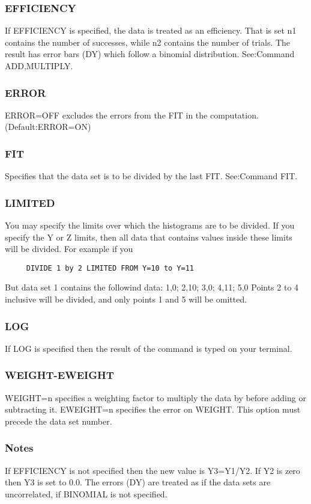 \subsubsection{EFFICIENCY}
If EFFICIENCY is specified, the data is treated as an efficiency.  That
is set n1 contains the number  of  successes,  while  n2  contains  the
number  of  trials.   The  result  has  error  bars (DY) which follow a
binomial distribution.  See:Command ADD,MULTIPLY.  
\subsubsection{ERROR}
ERROR=OFF excludes the errors from the FIT in the computation.  
(Default:ERROR=ON) 
\subsubsection{FIT}
Specifies  that  the  data  set  is  to  be  divided  by  the last FIT.
See:Command FIT.  
\subsubsection{LIMITED}
You may specify the limits over which the histograms are to be divided.
If you specify the Y or Z limits, then all data  that  contains  values
inside these limits will be divided.  For example if you 
\begin{verbatim}
     DIVIDE 1 by 2 LIMITED FROM Y=10 to Y=11 
\end{verbatim}
But data set 1 contains the followind data:  
1,0;  2,10;  3,0;  4,11;  5,0 
Points  2  to 4 inclusive will be divided, and only points 1 and 5 will
be omitted.  
\subsubsection{LOG}
If  LOG  is  specified  then the result of the command is typed on your
terminal.  
\subsubsection{WEIGHT-EWEIGHT}
WEIGHT=n  specifies  a  weighting factor to multiply the data by before
adding or subtracting it.  EWEIGHT=n specifies  the  error  on  WEIGHT.
This option must precede the data set number.  
\subsubsection{Notes}
If  EFFICIENCY  is not specified then the new value is Y3=Y1/Y2.  If Y2
is zero then Y3 is set to 0.0.  The errors (DY) are treated as  if  the
data sets are uncorrelated, if BINOMIAL is not specified.  
